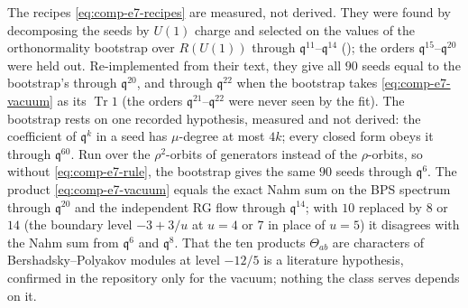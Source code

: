 \documentclass[11pt]{amsart}
\DeclareMathOperator{\Tr}{Tr}
\newcommand\fq{\mathfrak{q}}
\theoremstyle{remark}
\begin{document}
The recipes \eqref{eq:comp-e7-recipes} are measured, not derived.  They were
found by decomposing the seeds by $U(1)$ charge and selected on the values of
the orthonormality bootstrap over $R(U(1))$ through $\fq^{11}$--$\fq^{14}$
(); the orders $\fq^{15}$--$\fq^{20}$ were held out.  Re-implemented
from their text, they give all $90$ seeds equal to the bootstrap's through
$\fq^{20}$, and through $\fq^{22}$ when the bootstrap
takes \eqref{eq:comp-e7-vacuum} as its $\Tr1$ (the orders $\fq^{21}$--$\fq^{22}$
were never seen by the fit).  The bootstrap rests on one recorded hypothesis,
measured and not derived: the coefficient of $\fq^k$ in a seed has $\mu$-degree
at most $4k$; every closed form obeys it through $\fq^{60}$.  Run over the
$\rho^2$-orbits of generators instead of the $\rho$-orbits, so without
\eqref{eq:comp-e7-rule}, the bootstrap gives the same $90$ seeds through
$\fq^6$.  The product \eqref{eq:comp-e7-vacuum} equals the exact Nahm sum on the
BPS spectrum through $\fq^{20}$ and the independent RG flow 
through $\fq^{14}$; with $10$ replaced by $8$ or $14$ (the boundary level
$-3+3/u$ at $u=4$ or $7$ in place of $u=5$) it disagrees with the Nahm sum from
$\fq^6$ and $\fq^8$.  That the ten products $\Theta_{ab}$ are characters of
Bershadsky--Polyakov modules at level
$-12/5$ is a literature hypothesis, confirmed in the repository only for the
vacuum; nothing the class serves depends on it.
\end{document}
